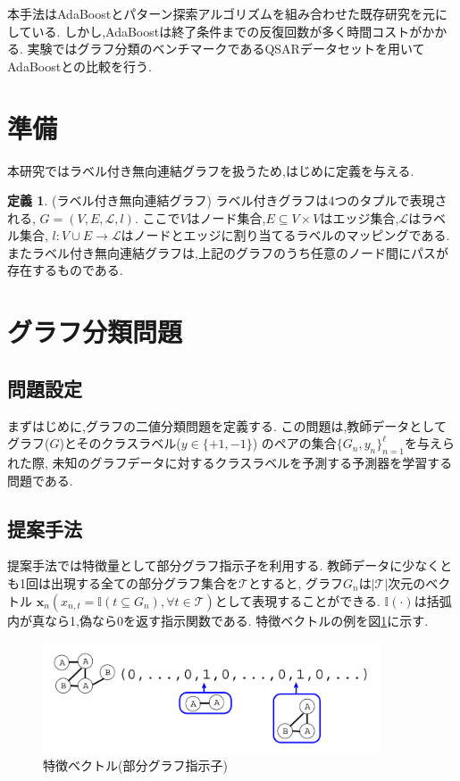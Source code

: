 \documentclass{zasshi-prml3}
\theoremstyle{definition}
\newtheorem{definition}[theorem]{定義}
\begin{document}
本手法はAdaBoostとパターン探索アルゴリズムを組み合わせた既存研究を元にしている.
しかし,AdaBoostは終了条件までの反復回数が多く時間コストがかかる.
実験ではグラフ分類のベンチマークであるQSARデータセットを用いてAdaBoostとの比較を行う.

\section{準備}
本研究ではラベル付き無向連結グラフを扱うため,はじめに定義を与える.
\begin{definition}(ラベル付き無向連結グラフ)
	ラベル付きグラフは4つのタプルで表現される,
	$G=(V, E, \mathcal{L}, l)$.
	ここで$V$はノード集合,$E \subseteq V \times V$はエッジ集合,$\mathcal{L}$はラベル集合,
	$l: V \cup E \rightarrow \mathcal{L}$はノードとエッジに割り当てるラベルのマッピングである.
	またラベル付き無向連結グラフは,上記のグラフのうち任意のノード間にパスが存在するものである.
\end{definition}

\section{グラフ分類問題}
\subsection{問題設定}
まずはじめに,グラフの二値分類問題を定義する.
この問題は,教師データとしてグラフ($G$)とそのクラスラベル($y \in \{+1, -1\}$)
のペアの集合$\{G_n, y_n\}^{\ell}_{n=1}$を与えられた際,
未知のグラフデータに対するクラスラベルを予測する予測器を学習する問題である.

\subsection{提案手法}
提案手法では特徴量として部分グラフ指示子を利用する.
教師データに少なくとも1回は出現する全ての部分グラフ集合を$\mathcal{T}$とすると,
グラフ$G_n$は$|\mathcal{T}|$次元のベクトル
$\bm{x}_n(x_{n,t} = \mathbb{I}(t \subseteq G_n), \forall t \in \mathcal{T})$として表現することができる.
$\mathbb{I}(\cdot)$は括弧内が真なら1,偽なら0を返す指示関数である.
特徴ベクトルの例を図\ref{feature_vec}に示す.
\begin{figure}[b]
	\centering
	\includegraphics[width=100mm]{figure/feature_vec.png}
	\caption{特徴ベクトル(部分グラフ指示子)}
	\label{feature_vec}
\end{figure}
\end{document}
